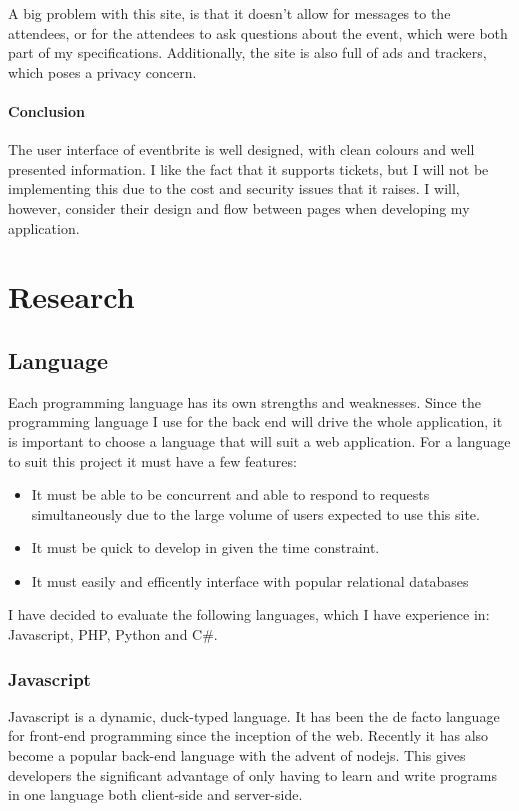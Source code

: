 \documentclass[a4paper,oneside,12pt,draft]{report}
\begin{document}
	A big problem with this site, is that it doesn't allow for messages to the attendees, or for the attendees to ask questions about the event, which were both part of my specifications. Additionally, the site is also full of ads and trackers, which poses a privacy concern.

	\subsubsection{Conclusion}
	The user interface of eventbrite is well designed, with clean colours and well presented information. I like the fact that it supports tickets, but I will not be implementing this due to the cost and security issues that it raises. I will, however, consider their design and flow between pages when developing my application.

	\chapter{Research}

	\section{Language}
	Each programming language has its own strengths and weaknesses. Since the programming language I use for the back end will drive the whole application, it is important to choose a language that will suit a web application. For a language to suit this project it must have a few features:

	\begin{itemize}
		\item It must be able to be concurrent and able to respond to requests simultaneously due to the large volume of users expected to use this site.
		\item It must be quick to develop in given the time constraint.
		\item It must easily and efficently interface with popular relational databases
	\end{itemize}

	I have decided to evaluate the following languages, which I have experience in: Javascript, PHP, Python and C\#.

	\subsection{Javascript}
	Javascript is a dynamic, duck-typed language. It has been the de facto language for front-end programming since the inception of the web. Recently it has also become a popular back-end language with the advent of nodejs. This gives developers the significant advantage of only having to learn and write programs in one language both client-side and server-side.
\end{document}
